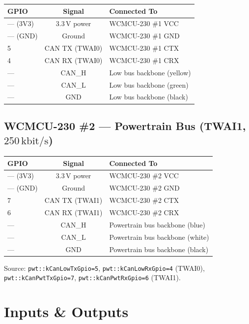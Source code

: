 \documentclass[12pt,a4paper,oneside]{report}
\newcommand{\bitrate}[1]{\ensuremath{#1\,\text{kbit/s}}}
\begin{document}
\begin{center}
\begin{tabular}{lcl}
\toprule
\textbf{GPIO} & \textbf{Signal} & \textbf{Connected To} \\
\midrule
--- (3V3) & 3.3\,V power & WCMCU-230 \#1 VCC \\
--- (GND) & Ground       & WCMCU-230 \#1 GND \\
5         & CAN TX (TWAI0) & WCMCU-230 \#1 CTX \\
4         & CAN RX (TWAI0) & WCMCU-230 \#1 CRX \\
---       & CAN\_H        & Low bus backbone (yellow) \\
---       & CAN\_L        & Low bus backbone (green) \\
---       & GND           & Low bus backbone (black) \\
\bottomrule
\end{tabular}
\end{center}

\subsection{WCMCU-230 \#2 --- Powertrain Bus (TWAI1, \bitrate{250})}

\begin{center}
\begin{tabular}{lcl}
\toprule
\textbf{GPIO} & \textbf{Signal} & \textbf{Connected To} \\
\midrule
--- (3V3) & 3.3\,V power & WCMCU-230 \#2 VCC \\
--- (GND) & Ground       & WCMCU-230 \#2 GND \\
7         & CAN TX (TWAI1) & WCMCU-230 \#2 CTX \\
6         & CAN RX (TWAI1) & WCMCU-230 \#2 CRX \\
---       & CAN\_H        & Powertrain bus backbone (blue) \\
---       & CAN\_L        & Powertrain bus backbone (white) \\
---       & GND           & Powertrain bus backbone (black) \\
\bottomrule
\end{tabular}
\end{center}

\noindent Source: \texttt{pwt::kCanLowTxGpio=5}, \texttt{pwt::kCanLowRxGpio=4} (TWAI0), \texttt{pwt::kCanPwtTxGpio=7}, \texttt{pwt::kCanPwtRxGpio=6} (TWAI1).

\section{Inputs \& Outputs}
\end{document}
